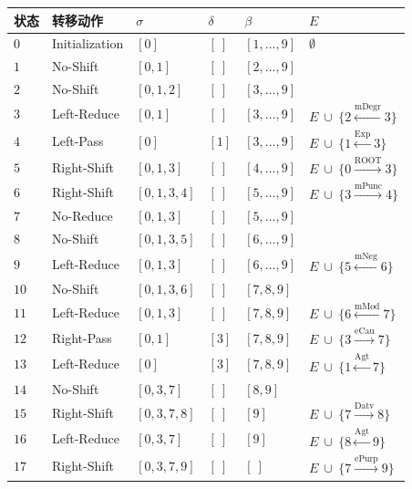 \begin{table}[thbp]
    \vspace{0.5em}\centering\wuhao
	\begin{tabular}{C{3em}L{7em}R{4.5em}C{4em}L{4em}L{9em}}
		\toprule[1.5pt]
		\bf 状态 & \bf 转移动作 & $\sigma$ & $\delta$ & $\beta$ & $E$ \\
		\midrule[1pt]
		$0$ & Initialization & $[0]$ & $[\ ]$ & $[1, \dots, 9]$ & $\emptyset $ \\
		$1$ & No-Shift & $[0, 1]$ & $[\ ]$ & $[2, \dots, 9]$ &  \\
		$2$ & No-Shift & $[0, 1, 2]$ & $[\ ]$ & $[3, \dots, 9]$ &  \\
		$3$ & Left-Reduce & $[0, 1]$ & $[\ ]$ & $[3, \dots, 9]$ & $E\ \cup\ \{2\xleftarrow{\textrm{mDegr}}3\}$ \\
		$4$ & Left-Pass & $[0]$ & $[1]$ & $[3, \dots, 9]$ & $E\ \cup\ \{1\xleftarrow{\textrm{Exp}}3\}$ \\
		$5$ & Right-Shift & $[0, 1, 3]$ & $[\ ]$ & $[4, \dots, 9]$ & $E\ \cup\ \{0\xrightarrow{\textrm{ROOT}}3\}$ \\
		$6$ & Right-Shift & $[0, 1, 3, 4]$ & $[\ ]$ & $[5, \dots, 9]$ & $E\ \cup\ \{3\xrightarrow{\textrm{mPunc}}4\}$ \\
		$7$ & No-Reduce & $[0, 1, 3]$ & $[\ ]$ & $[5, \dots, 9]$ &  \\
		$8$ & No-Shift & $[0, 1, 3, 5]$ & $[\ ]$ & $[6, \dots, 9]$ &  \\
		$9$ & Left-Reduce & $[0, 1, 3]$ & $[\ ]$ & $[6, \dots, 9]$ & $E\ \cup\ \{5\xleftarrow{\textrm{mNeg}}6\}$ \\
		$10$ & No-Shift & $[0, 1, 3, 6]$ & $[\ ]$ & $[7, 8, 9]$ &  \\
		$11$ & Left-Reduce & $[0, 1, 3]$ & $[\ ]$ & $[7, 8, 9]$ & $E\ \cup\ \{6\xleftarrow{\textrm{mMod}}7\}$ \\
		$12$ & Right-Pass & $[0, 1]$ & $[3]$ & $[7, 8, 9]$ & $E\ \cup\ \{3\xrightarrow{\textrm{eCau}}7\}$ \\
		$13$ & Left-Reduce & $[0]$ & $[3]$ & $[7, 8, 9]$ & $E\ \cup\ \{1\xleftarrow{\textrm{Agt}}7\}$ \\
		$14$ & No-Shift & $[0, 3, 7]$ & $[\ ]$ & $[8, 9]$ &  \\
		$15$ & Right-Shift & $[0, 3, 7, 8]$ & $[\ ]$ & $[9]$ & $E\ \cup\ \{7\xrightarrow{\textrm{Datv}}8\}$ \\
		$16$ & Left-Reduce & $[0, 3, 7]$ & $[\ ]$ & $[9]$ & $E\ \cup\ \{8\xleftarrow{\textrm{Agt}}9\}$ \\
		$17$ & Right-Shift & $[0, 3, 7, 9]$ & $[\ ]$ & $[\ ]$ & $E\ \cup\ \{7\xrightarrow{\textrm{ePurp}}9\}$ \\
		\bottomrule[1.5pt]
	\end{tabular}
\end{table}


